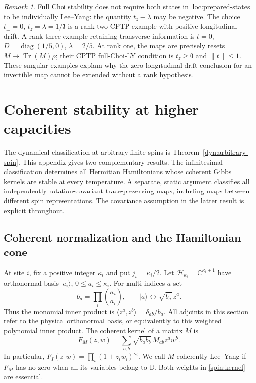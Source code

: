 \documentclass[reqno]{amsart}
\theoremstyle{definition}
\theoremstyle{remark}
\newtheorem{remark}[theorem]{Remark}
\newcommand{\C}{\mathbb C}
\newcommand{\D}{\mathbb D}
\DeclareMathOperator{\Tr}{Tr}
\DeclareMathOperator{\diag}{diag}
\begin{document}
\begin{remark}\label{loc:singular-distinction}
Full Choi stability does not require both states in
\eqref{loc:prepared-states} to be individually Lee--Yang: the quantity
$t_z-\lambda$ may be negative.  The choice
$t_\perp=0$, $t_z=\lambda=1/3$ is a rank-two CPTP example with
positive longitudinal drift.  A rank-three example retaining transverse
information is $t=0$, $D=\diag(1/5,0)$, $\lambda=2/5$.
At rank one, the maps are precisely resets
$M\mapsto\Tr(M)\rho$; their CPTP full-Choi-LY condition is
$t_z\geq0$ and $\|t\|\leq1$.
These singular examples explain why the zero longitudinal drift conclusion for an
invertible map cannot be extended without a rank hypothesis.
\end{remark}


\section{Coherent stability at higher capacities}\label{spin:section}

The dynamical classification at arbitrary finite spins is
Theorem~\ref{dyn:arbitrary-spin}. This appendix gives two
complementary results. The infinitesimal classification determines all Hermitian
Hamiltonians whose coherent Gibbs kernels are stable at every temperature.
A separate, static argument classifies all independently rotation-covariant
trace-preserving maps, including maps between different spin representations.
The covariance assumption in the latter result is explicit throughout.

\subsection{Coherent normalization and the Hamiltonian cone}

At site $i$, fix a positive integer $\kappa_i$ and put $j_i=\kappa_i/2$.
Let $\mathcal H_{\kappa_i}=\C^{\kappa_i+1}$ have orthonormal basis
$|a_i\rangle$, $0\leq a_i\leq\kappa_i$.  For multi-indices $a$ set
\begin{equation}\label{spin:weights}
 b_a=\prod_i\binom{\kappa_i}{a_i},\qquad
 |a\rangle\longleftrightarrow \sqrt{b_a}\,z^a.
\end{equation}
Thus the monomial inner product is
$\langle z^a,z^b\rangle=\delta_{ab}/b_a$.  All adjoints in this section
refer to the physical orthonormal basis, or equivalently to this weighted
polynomial inner product.  The coherent kernel of a matrix $M$ is
\begin{equation}\label{spin:kernel}
 F_M(z,w)=\sum_{a,b}\sqrt{b_a b_b}\,M_{ab}z^a w^b.
\end{equation}
In particular, $F_I(z,w)=\prod_i(1+z_iw_i)^{\kappa_i}$.
We call $M$ coherently Lee--Yang if $F_M$ has no zero when all its variables
belong to $\D$.  Both weights in \eqref{spin:kernel} are essential.
\end{document}
